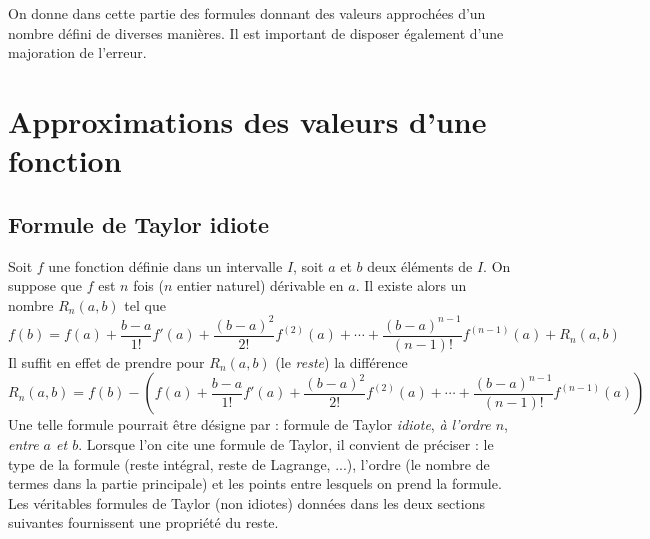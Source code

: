 
On donne dans cette partie des formules donnant des valeurs approchées d'un nombre défini de diverses manières. Il est important de disposer également d'une majoration de l'erreur.

\section{Approximations des valeurs d'une fonction}
\subsection{Formule de Taylor idiote}
Soit $f$ une fonction définie dans un intervalle $I$, soit $a$ et $b$ deux éléments de $I$. On suppose que $f$ est $n$ fois ($n$ entier naturel)  dérivable en $a$. Il existe alors un nombre $R_n(a,b)$ tel que
\begin{displaymath}
 f(b)= f(a)+\frac{b-a}{1!}f'(a)+\frac{(b-a)^2}{2!}f^{(2)}(a) + \cdots +
\frac{(b-a)^{n-1}}{(n-1)!}f^{(n-1)}(a) +
R_n(a,b)
\end{displaymath}
Il suffit en effet de prendre pour $R_n(a,b)$ (le \emph{reste}) la différence
\begin{displaymath}
R_n(a,b)= f(b)- \left( f(a)+\frac{b-a}{1!}f'(a)+\frac{(b-a)^2}{2!}f^{(2)}(a) + \cdots +
\frac{(b-a)^{n-1}}{(n-1)!}f^{(n-1)}(a)\right) 
\end{displaymath}
Une telle formule pourrait être désigne par : formule de Taylor \emph{idiote}, \emph{à l'ordre $n$}, \emph{entre $a$ et $b$}. Lorsque l'on cite une formule de Taylor, il convient de préciser : le type de la formule (reste intégral, reste de Lagrange, ...), l'ordre (le nombre de termes dans la partie principale) et les points entre lesquels on prend la formule.\\
Les véritables formules de Taylor (non idiotes) données dans les deux sections suivantes fournissent une propriété du reste.

